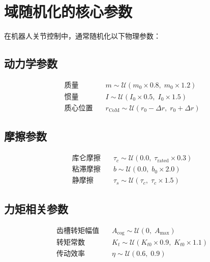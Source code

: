 \section{域随机化的核心参数}

在机器人关节控制中，通常随机化以下物理参数：

\subsection{动力学参数}

\begin{equation}
\begin{aligned}
\text{质量} &\quad m \sim \mathcal{U}(m_0 \times 0.8,\; m_0 \times 1.2) \\
\text{惯量} &\quad I \sim \mathcal{U}(I_0 \times 0.5,\; I_0 \times 1.5) \\
\text{质心位置} &\quad r_{\text{CoM}} \sim \mathcal{U}(r_0 - \Delta r,\; r_0 + \Delta r)
\end{aligned}
\end{equation}

\subsection{摩擦参数}

\begin{equation}
\begin{aligned}
\text{库仑摩擦} &\quad \tau_c \sim \mathcal{U}(0.0,\; \tau_{\text{rated}} \times 0.3) \\
\text{粘滞摩擦} &\quad b \sim \mathcal{U}(0.0,\; b_0 \times 2.0) \\
\text{静摩擦}  &\quad \tau_s \sim \mathcal{U}(\tau_c,\; \tau_c \times 1.5)
\end{aligned}
\end{equation}

\subsection{力矩相关参数}

\begin{equation}
\begin{aligned}
\text{齿槽转矩幅值} &\quad A_{\text{cog}} \sim \mathcal{U}(0,\; A_{\text{max}}) \\
\text{转矩常数} &\quad K_t \sim \mathcal{U}(K_{t0} \times 0.9,\; K_{t0} \times 1.1) \\
\text{传动效率} &\quad \eta \sim \mathcal{U}(0.6,\; 0.9)
\end{aligned}
\end{equation}

